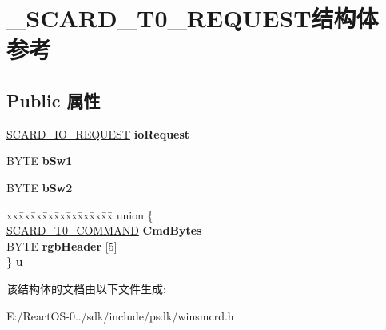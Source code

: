 \hypertarget{struct___s_c_a_r_d___t0___r_e_q_u_e_s_t}{}\section{\+\_\+\+S\+C\+A\+R\+D\+\_\+\+T0\+\_\+\+R\+E\+Q\+U\+E\+S\+T结构体 参考}
\label{struct___s_c_a_r_d___t0___r_e_q_u_e_s_t}
\subsection*{Public 属性}
\begin{DoxyCompactItemize}
\item 
\mbox{\label{struct___s_c_a_r_d___t0___r_e_q_u_e_s_t_ab89d0f0ed85bd67dfcad551e0498999e}} 
\hyperlink{struct___s_c_a_r_d___i_o___r_e_q_u_e_s_t}{S\+C\+A\+R\+D\+\_\+\+I\+O\+\_\+\+R\+E\+Q\+U\+E\+ST} {\bfseries io\+Request}
\item 
\mbox{\label{struct___s_c_a_r_d___t0___r_e_q_u_e_s_t_a9df8dd6ecd750a8aa3a7713f94613e69}} 
B\+Y\+TE {\bfseries b\+Sw1}
\item 
\mbox{\label{struct___s_c_a_r_d___t0___r_e_q_u_e_s_t_a038f698dcdd8bd44f03a0a3681f639bd}} 
B\+Y\+TE {\bfseries b\+Sw2}
\item 
\mbox{\label{struct___s_c_a_r_d___t0___r_e_q_u_e_s_t_a90cb7841685f5af9829bb30d3cb2d928}} 
\begin{tabbing}
xx\=xx\=xx\=xx\=xx\=xx\=xx\=xx\=xx\=\kill
union \{\\
\>\hyperlink{struct___s_c_a_r_d___t0___c_o_m_m_a_n_d}{SCARD\_T0\_COMMAND} {\bfseries CmdBytes}\\
\>BYTE {\bfseries rgbHeader} \mbox{[}5\mbox{]}\\
\} {\bfseries u}\\

\end{tabbing}\end{DoxyCompactItemize}


该结构体的文档由以下文件生成\+:\begin{DoxyCompactItemize}
\item 
E\+:/\+React\+O\+S-\/0../sdk/include/psdk/winsmcrd.\+h\end{DoxyCompactItemize}
